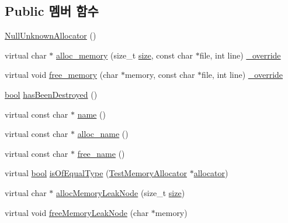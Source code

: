 \subsection*{Public 멤버 함수}
\begin{DoxyCompactItemize}
\item 
\hyperlink{class_null_unknown_allocator_a023b13615d8d54acc53a031b5658ecd2}{Null\+Unknown\+Allocator} ()
\item 
virtual char $\ast$ \hyperlink{class_null_unknown_allocator_a126f004b0a561fbedbba12273cfbbd61}{alloc\+\_\+memory} (size\+\_\+t \hyperlink{gst__avb__playbin_8c_a439227feff9d7f55384e8780cfc2eb82}{size}, const char $\ast$file, int line) \hyperlink{_cpp_u_test_config_8h_a049bea15dd750e15869863c94c1efc3b}{\+\_\+override}
\item 
virtual void \hyperlink{class_null_unknown_allocator_a7c662c2adde1ec0a375b14c0d106b6d5}{free\+\_\+memory} (char $\ast$memory, const char $\ast$file, int line) \hyperlink{_cpp_u_test_config_8h_a049bea15dd750e15869863c94c1efc3b}{\+\_\+override}
\item 
\hyperlink{avb__gptp_8h_af6a258d8f3ee5206d682d799316314b1}{bool} \hyperlink{class_test_memory_allocator_ae26c82159ce24eb59770352585b402fd}{has\+Been\+Destroyed} ()
\item 
virtual const char $\ast$ \hyperlink{class_test_memory_allocator_a6a96605bec5749750a0b4be6e2d6e721}{name} ()
\item 
virtual const char $\ast$ \hyperlink{class_test_memory_allocator_afab6c44b5468c71a699c1efbd787e6e7}{alloc\+\_\+name} ()
\item 
virtual const char $\ast$ \hyperlink{class_test_memory_allocator_aac134aac79b30bc5903d0b2b7cc55b74}{free\+\_\+name} ()
\item 
virtual \hyperlink{avb__gptp_8h_af6a258d8f3ee5206d682d799316314b1}{bool} \hyperlink{class_test_memory_allocator_a3d6a5cc2f6b7a38b3f1d3e0567bf4f93}{is\+Of\+Equal\+Type} (\hyperlink{class_test_memory_allocator}{Test\+Memory\+Allocator} $\ast$\hyperlink{_memory_leak_warning_test_8cpp_a83fc2e9b9142613f7df2bcc3ff8292bc}{allocator})
\item 
virtual char $\ast$ \hyperlink{class_test_memory_allocator_a1a786ad58b46528e82235a14fa667c1d}{alloc\+Memory\+Leak\+Node} (size\+\_\+t \hyperlink{gst__avb__playbin_8c_a439227feff9d7f55384e8780cfc2eb82}{size})
\item 
virtual void \hyperlink{class_test_memory_allocator_a10f2958f3b7378256e933896ccc93df0}{free\+Memory\+Leak\+Node} (char $\ast$memory)
\end{DoxyCompactItemize}
